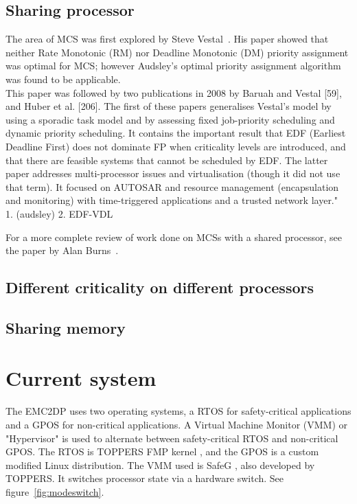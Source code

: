 \subsection{Sharing processor}
The area of MCS was first explored by Steve Vestal~\cite{vestal2007}. His paper showed that neither Rate Monotonic (RM) nor Deadline Monotonic (DM) priority assignment was optimal for MCS; however Audsley’s optimal priority assignment algorithm \cite{audsley2001} was found to be applicable. \\ %

This paper was followed by two publications in 2008 by Baruah and Vestal [59], and Huber et al. [206]. The first of these papers generalises Vestal’s model by using a sporadic task model and by assessing fixed job-priority scheduling and dynamic priority scheduling. It contains the important result that EDF (Earliest Deadline First) does not dominate FP when criticality levels are introduced, and that there are feasible systems that cannot be scheduled by EDF. The latter paper addresses multi-processor issues and virtualisation (though it did not use that term). It focused on AUTOSAR and resource management (encapsulation and monitoring) with time-triggered applications and a trusted network layer." \\

1. (audsley) 2. EDF-VDL

For a more complete review of work done on MCSs with a shared processor, see the paper by Alan Burns~\cite{burns2016}.

\subsection{Different criticality on different processors}


\subsection{Sharing memory}

\section{Current system}
\label{sec:lit_emc2mcs}
The EMC2DP uses two operating systems, a RTOS for safety-critical applications and a GPOS for non-critical applications. A Virtual Machine Monitor (VMM) or "Hypervisor" is used to alternate between safety-critical RTOS and non-critical GPOS. The RTOS is TOPPERS FMP kernel \cite{website:FMP}, and the GPOS is a custom modified Linux distribution. The VMM used is SafeG \cite{website:safeg}, also developed by TOPPERS. It switches processor state via a hardware switch. See figure~\ref{fig:modeswitch}.

